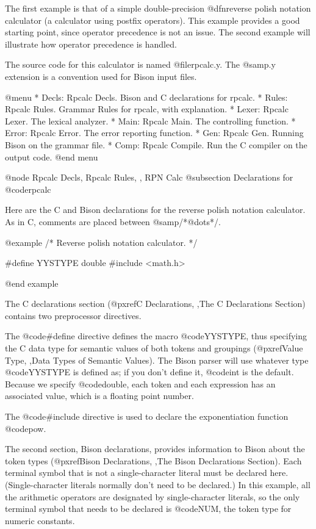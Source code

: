 {The first example is that of a simple double-precision @dfn{reverse polish
notation} calculator (a calculator using postfix operators).  This example
provides a good starting point, since operator precedence is not an issue.
The second example will illustrate how operator precedence is handled.

The source code for this calculator is named @file{rpcalc.y}.  The
@samp{.y} extension is a convention used for Bison input files.

@menu
* Decls: Rpcalc Decls.  Bison and C declarations for rpcalc.
* Rules: Rpcalc Rules.  Grammar Rules for rpcalc, with explanation.
* Lexer: Rpcalc Lexer.  The lexical analyzer.
* Main: Rpcalc Main.    The controlling function.
* Error: Rpcalc Error.  The error reporting function.
* Gen: Rpcalc Gen.      Running Bison on the grammar file.
* Comp: Rpcalc Compile. Run the C compiler on the output code.
@end menu

@node Rpcalc Decls, Rpcalc Rules,  , RPN Calc
@subsection Declarations for @code{rpcalc}

Here are the C and Bison declarations for the reverse polish notation
calculator.  As in C, comments are placed between @samp{/*@dots{}*/}.

@example
/* Reverse polish notation calculator. */

#define YYSTYPE double
#include <math.h>


@end example

The C declarations section (@pxref{C Declarations, ,The C Declarations Section}) contains two
preprocessor directives.

The @code{#define} directive defines the macro @code{YYSTYPE}, thus
specifying the C data type for semantic values of both tokens and groupings
(@pxref{Value Type, ,Data Types of Semantic Values}).  The Bison parser will use whatever type
@code{YYSTYPE} is defined as; if you don't define it, @code{int} is the
default.  Because we specify @code{double}, each token and each expression
has an associated value, which is a floating point number.

The @code{#include} directive is used to declare the exponentiation
function @code{pow}.

The second section, Bison declarations, provides information to Bison about
the token types (@pxref{Bison Declarations, ,The Bison Declarations Section}).  Each terminal symbol that is
not a single-character literal must be declared here.  (Single-character
literals normally don't need to be declared.)  In this example, all the
arithmetic operators are designated by single-character literals, so the
only terminal symbol that needs to be declared is @code{NUM}, the token
type for numeric constants.

}
